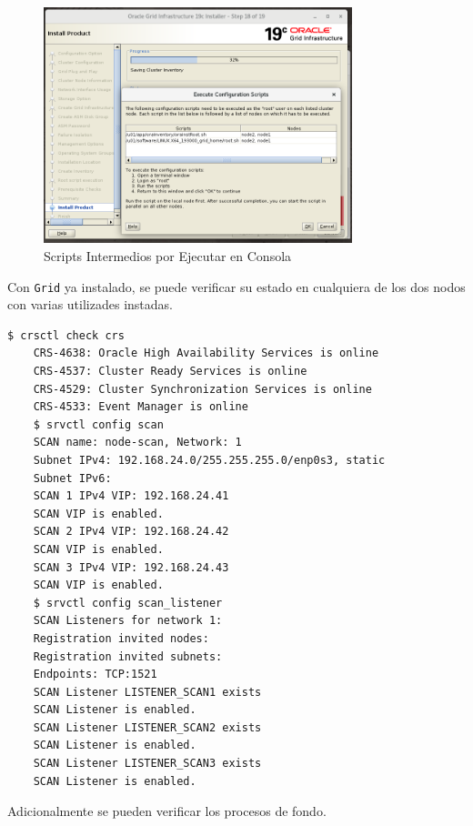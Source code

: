 \documentclass{article}
\begin{document}
\begin{figure}[H]
		\begin{center}
			\includegraphics[width=0.80\textwidth]{grid_install_18_1_install_scripts.png}
		\end{center}
		\caption{Scripts Intermedios por Ejecutar en Consola}
\end{figure}

Con \texttt{Grid} ya instalado, se puede verificar su estado en cualquiera de los dos nodos con varias utilizades instadas.

\begin{lstlisting}[style=mystyle,language=bash]
	$ crsctl check crs
	CRS-4638: Oracle High Availability Services is online
	CRS-4537: Cluster Ready Services is online
	CRS-4529: Cluster Synchronization Services is online
	CRS-4533: Event Manager is online
	$ srvctl config scan
	SCAN name: node-scan, Network: 1
	Subnet IPv4: 192.168.24.0/255.255.255.0/enp0s3, static
	Subnet IPv6: 
	SCAN 1 IPv4 VIP: 192.168.24.41
	SCAN VIP is enabled.
	SCAN 2 IPv4 VIP: 192.168.24.42
	SCAN VIP is enabled.
	SCAN 3 IPv4 VIP: 192.168.24.43
	SCAN VIP is enabled.
	$ srvctl config scan_listener
	SCAN Listeners for network 1:
	Registration invited nodes: 
	Registration invited subnets: 
	Endpoints: TCP:1521
	SCAN Listener LISTENER_SCAN1 exists
	SCAN Listener is enabled.
	SCAN Listener LISTENER_SCAN2 exists
	SCAN Listener is enabled.
	SCAN Listener LISTENER_SCAN3 exists
	SCAN Listener is enabled.
\end{lstlisting}

Adicionalmente se pueden verificar los procesos de fondo.
\end{document}
